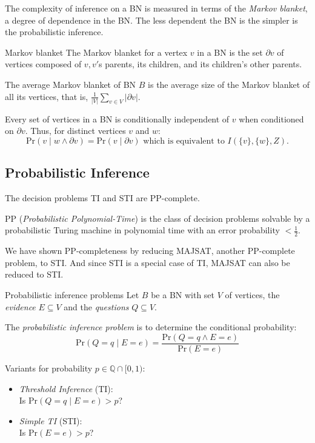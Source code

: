 \documentclass[english]{panikzettel}
\renewcommand{\Pr}{\mathrm{Pr}}
\newcommand{\rat}{\mathbb{Q}}
\begin{document}
The complexity of inference on a BN is measured in terms of the \emph{Markov blanket}, a degree of dependence in the BN.
The less dependent the BN is the simpler is the probabilistic inference.

\begin{defi}{Markov blanket}
    The Markov blanket for a vertex $v$ in a BN is the set $\partial v$ of vertices composed of $v, v'$s parents, its children, and its children's other parents.

    The average Markov blanket of BN $B$ is the average size of the Markov blanket of all its vertices, that is, $\frac{1}{|V|}\sum_{v \in V} |\partial v|$.
\end{defi}

Every set of vertices in a BN is conditionally independent of $v$ when conditioned on $\partial v$. Thus, for distinct vertices $v$ and $w$:
$$\Pr(v \mid w \land \partial v) = \Pr(v \mid \partial v) \text{ which is equivalent to } I(\{v\},\{w\},Z).$$

\subsection{Probabilistic Inference}

\begin{halfboxl}
    The decision problems TI and STI are PP-complete.

    PP (\emph{Probabilistic Polynomial-Time}) is the class of decision problems solvable by a probabilistic Turing machine in polynomial time with an error probability $< \frac{1}{2}$.

    We have shown PP-completeness by reducing MAJSAT, another PP-complete problem, to STI.
    And since STI is a special case of TI, MAJSAT can also be reduced to STI.
\end{halfboxl}%
\begin{halfboxr}
    \vspace{-\baselineskip}
    \begin{defi}{Probabilistic inference problems}
        Let $B$ be a BN with set $V$ of vertices, the \emph{evidence} $E \subseteq V$ and the \emph{questions} $Q \subseteq V$.

        The \emph{probabilistic inference problem} is to determine the conditional probability:
        $$\Pr(Q=q \mid E=e)=\frac{\Pr(Q=q \land E=e)}{\Pr(E=e)}$$

        Variants for probability $p \in \rat \cap [0,1)$:
        \begin{itemize}
            \item \emph{Threshold Inference} (TI): \\
                   Is $\Pr(Q=q \mid E=e) > p$?
            \item \emph{Simple TI} (STI): \\
                  Is $\Pr(E=e) > p$?
        \end{itemize}
    \end{defi}
\end{halfboxr}
\end{document}
